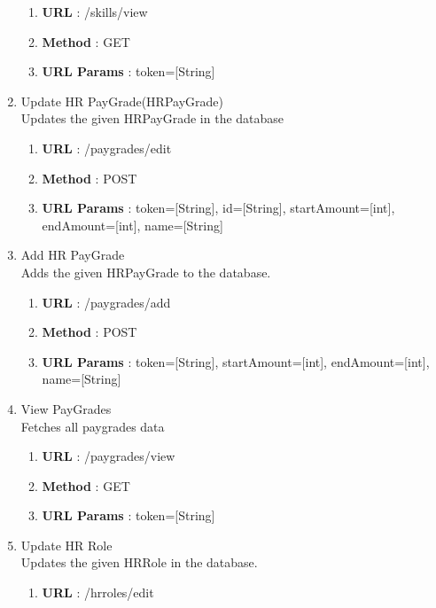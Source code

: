 \documentclass[11pt, titlepage]{article}
\begin{document}
\begin{enumerate}
                \begin{enumerate}
                    \item \textbf{URL} : /skills/view
                    \item \textbf{Method} : GET
                    \item \textbf{URL Params} : token=[String]
                \end{enumerate}  
        \item Update HR PayGrade(HRPayGrade) \\
             Updates the given HRPayGrade in the database
                \begin{enumerate}
                    \item \textbf{URL} : /paygrades/edit
                    \item \textbf{Method} : POST
                    \item \textbf{URL Params} : token=[String], id=[String], startAmount=[int], endAmount=[int], name=[String]
                \end{enumerate}
        \item Add HR PayGrade \\
             Adds the given HRPayGrade to the database.
                \begin{enumerate}
                    \item \textbf{URL} : /paygrades/add
                    \item \textbf{Method} : POST
                    \item \textbf{URL Params} : token=[String], startAmount=[int], endAmount=[int], name=[String]
                \end{enumerate}
        \item View PayGrades \\
             Fetches all paygrades data
                \begin{enumerate}
                    \item \textbf{URL} : /paygrades/view
                    \item \textbf{Method} : GET
                    \item \textbf{URL Params} : token=[String]
                \end{enumerate}
        \item Update HR Role \\
             Updates the given HRRole in the database.
                \begin{enumerate}
                    \item \textbf{URL} : /hrroles/edit

\end{enumerate}
\end{enumerate}
\end{document}
